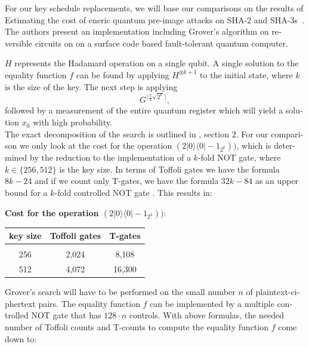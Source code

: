 \documentclass[a4paper,11pt]{article}
\begin{document}
\begin{otherlanguage}{english}
\begin{multicols}{2}
\noindent
For our key schedule replacements, we will base our comparisons on the results of \glqq Estimating the cost of eneric quantum pre-image attacks on SHA-2 and SHA-3s\grqq \, \cite{QSH}. The authors present an implementation including Grover's algorithm on reversible circuits on on a surface code based fault-tolerant quantum computer.

\noindent
$H$ represents the Hadamard operation on a single qubit. A single solution to the equality function $f$ can be found by applying $H^{\otimes k+1}$ to the initial state, where $k$ is the size of the key. The next step is applying 
$$G^{\lceil \frac{\pi}{4} \sqrt{2^k}\rceil},$$ 
followed by a measurement of the entire quantum register which will yield a solution $x_0$ with high probability.\\

\noindent
The exact decomposition of the search is outlined in \cite{GRO}, section $2$. For our comparison we only look at the cost for the operation $(2 |0\rangle \langle 0| -1_{2^k}))$, which is determined by the reduction to the implementation of a $k$-fold NOT gate, where $k \in \{256,512\}$ is the key size. In terms of Toffoli gates we have the formula $8k-24$ \cite{EQC} and if we count only T-gates, we have the formula $32k-84$ as an upper bound for a $k$-fold controlled NOT gate \cite{QAN}. This results in:

  \begin{center}
  \textbf{Cost for the operation $(2 |0\rangle \langle 0| -1_{2^k}))$}: \\
  \vspace{0.2cm}
    \begin{tabular}{c|c|c}
    key size & Toffoli gates & T-gates \\
    \hline
      &  &  \\ [-8pt]
    256               &    2,024                &  8,108    \\ 
    512               &    4,072                &  16,300     \\  
    \end{tabular}
  \end{center}

\noindent
Grover's search will have to be performed on the small number $n$ of plaintext-ciphertext pairs. The equality function $f$ can be implemented by a multiple controlled NOT gate that has $128\cdot n$ controls. With above formulas, the needed number of Toffoli counts and T-counts to compute the equality function $f$ come down to: 


\end{multicols}
\end{otherlanguage}
\end{document}
